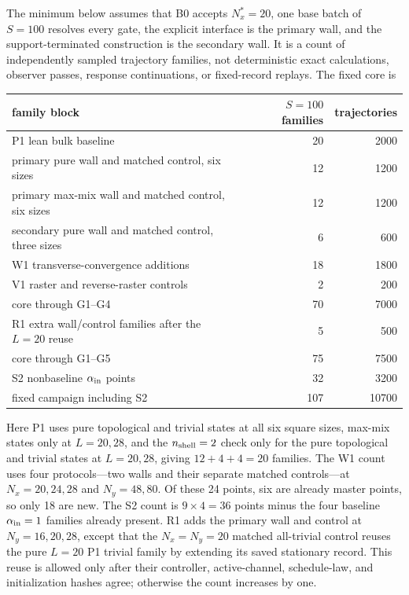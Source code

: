 \documentclass[aps,prx,onecolumn,nofootinbib,superscriptaddress,longbibliography]{revtex4-2}
\begin{document}
The minimum below assumes that B0 accepts $N_x^*=20$, one base batch of $S=100$ resolves
every gate, the explicit interface is the primary wall, and the support-terminated
construction is the secondary wall.  It is a count of independently sampled trajectory
families, not deterministic exact calculations, observer passes, response continuations,
or fixed-record replays.  The fixed core is
\begin{center}
\begin{tabular}{@{}lrr@{}}
\toprule
family block & $S=100$ families & trajectories \\
\midrule
P1 lean bulk baseline & 20 & 2000 \\
primary pure wall and matched control, six sizes & 12 & 1200 \\
primary max-mix wall and matched control, six sizes & 12 & 1200 \\
secondary pure wall and matched control, three sizes & 6 & 600 \\
W1 transverse-convergence additions & 18 & 1800 \\
V1 raster and reverse-raster controls & 2 & 200 \\
\midrule
core through G1--G4 & 70 & 7000 \\
R1 extra wall/control families after the $L=20$ reuse & 5 & 500 \\
\midrule
core through G1--G5 & 75 & 7500 \\
S2 nonbaseline $\alpha_{\rm in}$ points & 32 & 3200 \\
\midrule
fixed campaign including S2 & 107 & 10700 \\
\bottomrule
\end{tabular}
\end{center}
Here P1 uses pure topological and trivial states at all six square sizes, max-mix states
only at $L=20,28$, and the $n_{\rm shell}=2$ check only for the pure topological and
trivial states at $L=20,28$, giving $12+4+4=20$ families.  The W1 count uses four
protocols---two walls and their separate matched controls---at
$N_x=20,24,28$ and $N_y=48,80$.  Of these 24 points, six are already master points, so
only 18 are new.  The S2 count is $9\times4=36$ points minus the four baseline
$\alpha_{\rm in}=1$ families already present.  R1 adds the primary wall and control at
$N_y=16,20,28$, except that the $N_x=N_y=20$ matched all-trivial control reuses the
pure $L=20$ P1 trivial family by extending its saved stationary record.  This reuse is
allowed only after their controller, active-channel, schedule-law, and initialization
hashes agree; otherwise the count increases by one.
\end{document}
